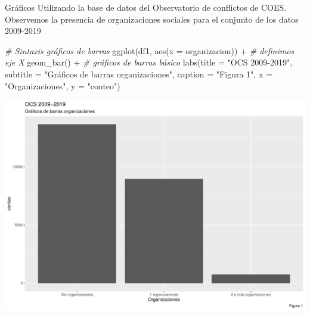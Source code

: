 \documentclass[
  8pt,
  ignorenonframetext,
]{beamer}
\newenvironment{Shaded}{\begin{snugshade}}{\end{snugshade}}
\newcommand{\AttributeTok}[1]{\textcolor[rgb]{0.77,0.63,0.00}{#1}}
\newcommand{\CommentTok}[1]{\textcolor[rgb]{0.56,0.35,0.01}{\textit{#1}}}
\newcommand{\FunctionTok}[1]{\textcolor[rgb]{0.00,0.00,0.00}{#1}}
\newcommand{\NormalTok}[1]{#1}
\newcommand{\SpecialCharTok}[1]{\textcolor[rgb]{0.00,0.00,0.00}{#1}}
\newcommand{\StringTok}[1]{\textcolor[rgb]{0.31,0.60,0.02}{#1}}
\begin{document}
\begin{frame}[fragile]{Gráficos}
\protect\hypertarget{gruxe1ficos-2}{}
Utilizando la base de datos del Observatorio de conflictos de COES.
Observemos la presencia de organizaciones sociales para el conjunto de
los datos 2009-2019

\begin{Shaded}
\begin{Highlighting}[]
\CommentTok{\# Sintaxis gráficos de barras}
\FunctionTok{ggplot}\NormalTok{(df1, }\FunctionTok{aes}\NormalTok{(}\AttributeTok{x =}\NormalTok{ organizacion)) }\SpecialCharTok{+} \CommentTok{\# definimos eje X }
  \FunctionTok{geom\_bar}\NormalTok{() }\SpecialCharTok{+}  \CommentTok{\# gráficos de barras básico}
  \FunctionTok{labs}\NormalTok{(}\AttributeTok{title =} \StringTok{"OCS 2009{-}2019"}\NormalTok{,}
       \AttributeTok{subtitle =} \StringTok{"Gráficos de barras organizaciones"}\NormalTok{, }
       \AttributeTok{caption =} \StringTok{"Figura 1"}\NormalTok{, }\AttributeTok{x =} \StringTok{"Organizaciones"}\NormalTok{, }\AttributeTok{y =} \StringTok{"conteo"}\NormalTok{)}
\end{Highlighting}
\end{Shaded}

\begin{center}\includegraphics[width=0.7\linewidth]{ta_3_files/figure-beamer/unnamed-chunk-10-1} \end{center}
\end{frame}
\end{document}
